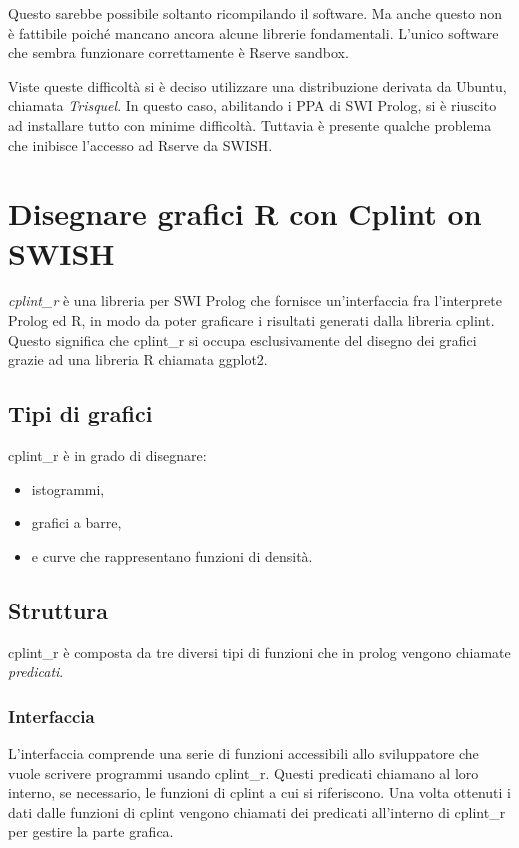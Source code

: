 \documentclass[10pt,titlepage,twoside,a4paper]{report}
\begin{document}
Questo sarebbe possibile soltanto ricompilando il software. Ma anche questo 
non è fattibile poiché mancano ancora alcune librerie fondamentali. L'unico 
software che sembra funzionare correttamente è Rserve sandbox.

Viste queste difficoltà si è deciso utilizzare una distribuzione derivata 
da Ubuntu, chiamata \emph{Trisquel}. In questo caso, abilitando i PPA di SWI 
Prolog\cite{SWIPrologPPA}, si è riuscito ad installare tutto con minime 
difficoltà. Tuttavia è presente qualche problema che inibisce l'accesso ad 
Rserve da SWISH.




\chapter{Disegnare grafici R con Cplint on SWISH} 
\label{disegnare-grafici-r-con-cplint-on-swish}
\emph{cplint\_r} è una libreria per SWI Prolog che fornisce un'interfaccia 
fra l'interprete Prolog ed R, in modo da poter graficare i risultati generati 
dalla libreria cplint. Questo significa che cplint\_r si occupa esclusivamente 
del disegno dei grafici grazie ad una libreria R chiamata ggplot2.

\section{Tipi di grafici}
cplint\_r è in grado di disegnare:
\begin{itemize}
    \item istogrammi,
    \item grafici a barre,
    \item e curve che rappresentano funzioni di densità.
\end{itemize}

\section{Struttura}
cplint\_r è composta da tre diversi tipi di funzioni che in prolog vengono 
chiamate \emph{predicati}.

\subsection{Interfaccia}
L'interfaccia comprende una serie di funzioni accessibili allo sviluppatore che 
vuole scrivere programmi usando cplint\_r. Questi predicati chiamano al loro 
interno, se necessario, le funzioni di cplint a cui si riferiscono. Una volta 
ottenuti i dati dalle funzioni di cplint vengono chiamati dei predicati 
all'interno di cplint\_r per gestire la parte grafica.
\end{document}
